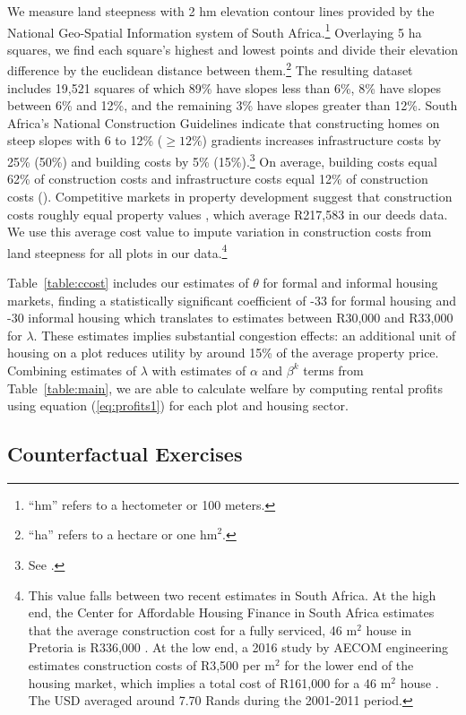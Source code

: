 \documentclass[12pt]{article}
\newcommand{\hmref}{
	``hm'' refers to a hectometer or 100 meters.
}
\newcommand{\haref}{
	``ha'' refers to a hectare or one $\text{hm}^{2}$.
}
\begin{document}
We measure land steepness with 2 hm elevation contour lines provided by the National Geo-Spatial Information system of South Africa.\footnote{\hmref}   Overlaying 5 ha squares, we find each square's highest and lowest points and divide their elevation difference by the euclidean distance between them.\footnote{\haref}   The resulting dataset includes 19,521 squares of which 89\% have slopes less than 6\%, 8\% have slopes between 6\% and 12\%, and the remaining 3\% have slopes greater than 12\%.  South Africa's National Construction Guidelines indicate that constructing homes on steep slopes with 6 to 12\% ($\geq12\%$) gradients increases infrastructure costs by 25\% (50\%) and building costs by 5\% (15\%).\footnote{See \cite{redbook}.}  On average, building costs equal 62\% of construction costs and infrastructure costs equal 12\% of construction costs (\cite{cahfcosts}).  Competitive markets in property development suggest that construction costs roughly equal property values \citep{cahfcosts}, which average R217,583 in our deeds data.  We use this average cost value to impute variation in construction costs from land steepness for all plots in our data.\footnote{This value falls between two recent estimates in South Africa.  At the high end, the Center for Affordable Housing Finance in South Africa estimates that the average construction cost for a fully serviced, 46 $\text{m}^{2}$ house  in Pretoria is R336,000 \citep{cahfcosts}.  At the low end, a 2016 study by AECOM engineering estimates construction costs of R3,500 per $\text{m}^{2}$ for the lower end of the housing market, which implies a total cost of R161,000 for a 46 $\text{m}^{2}$ house \citep{aecom}. The USD averaged around 7.70 Rands during the 2001-2011 period.}  

Table~\ref{table:ccost} includes our estimates of $\theta$ for formal and informal housing markets, finding a statistically significant coefficient of -33 for formal housing and -30 informal housing which translates to estimates between R30,000 and R33,000 for $\lambda$.  These estimates implies substantial congestion effects: an additional unit of housing on a plot reduces utility by around 15\% of the average property price.  Combining estimates of $\lambda$ with estimates of $\alpha$ and $\beta^{k}$ terms from Table~\ref{table:main}, we are able to calculate welfare by computing rental profits using equation (\ref{eq:profits1}) for each plot and housing sector.


\subsection{Counterfactual Exercises}
\end{document}
